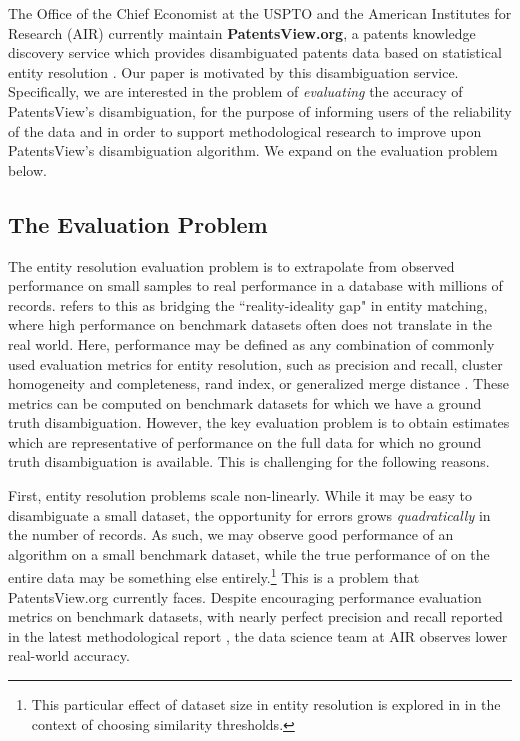 \documentclass[fontsize=11pt]{article}
\theoremstyle{definition}
\begin{document}
The Office of the Chief Economist at the USPTO and the American Institutes for Research (AIR) currently maintain \textbf{PatentsView.org}, a patents knowledge discovery service which provides disambiguated patents data based on statistical entity resolution \citep{toole2021patentsview}. Our paper is motivated by this disambiguation service. Specifically, we are interested in the problem of \textit{evaluating} the accuracy of PatentsView's disambiguation, for the purpose of informing users of the reliability of the data and in order to support methodological research to improve upon PatentsView's disambiguation algorithm. We expand on the evaluation problem below.

\subsection{The Evaluation Problem}\label{sec:challenges}

The entity resolution evaluation problem is to extrapolate from observed performance on small samples to real performance in a database with millions of records. \cite{Wang2022} refers to this as bridging the ``reality-ideality gap" in entity matching, where high performance on benchmark datasets often does not translate in the real world. Here, performance may be defined as any combination of commonly used evaluation metrics for entity resolution, such as precision and recall, cluster homogeneity and completeness, rand index, or generalized merge distance \citep{Maidasani2012}. These metrics can be computed on benchmark datasets for which we have a ground truth disambiguation. However, the key evaluation problem is to obtain estimates which are representative of performance on the full data for which no ground truth disambiguation is available. This is challenging for the following reasons.

First, entity resolution problems scale non-linearly. While it may be easy to disambiguate a small dataset, the opportunity for errors grows \textit{quadratically} in the number of records. As such, we may observe good performance of an algorithm on a small benchmark dataset, while the true performance of on the entire data may be something else entirely.\footnote{This particular effect of dataset size in entity resolution is explored in \cite{Draisbach2013} in the context of choosing similarity thresholds.} This is a problem that PatentsView.org currently faces. Despite encouraging performance evaluation metrics on benchmark datasets, with nearly perfect precision and recall reported in the latest methodological report \citep{Monath2021}, the data science team at AIR observes lower real-world accuracy.
\end{document}
